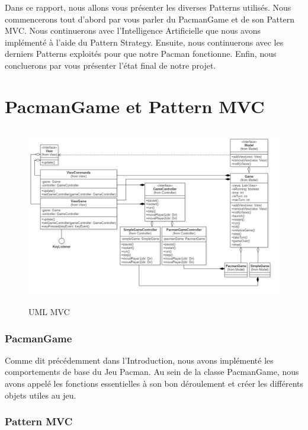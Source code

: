 \documentclass[a4paper, 11pt]{article}
\begin{document}
Dans ce rapport, nous allons vous présenter les diverses Patterns utilisés. Nous commencerons tout d'abord par vous parler du PacmanGame et de son Pattern MVC. Nous continuerons
avec l'Intelligence Artificielle que nous avons implémenté à l'aide du Pattern Strategy. Ensuite, nous continuerons avec les derniers Patterns exploités pour que notre 
Pacman fonctionne. Enfin, nous concluerons par vous présenter l'état final de notre projet.


\part{PacmanGame et Pattern MVC}

\begin{figure}[!ht]
  \begin{center}
  \includegraphics[height=7.8cm]{img/png/mvc}
  \end{center}
  \caption[schema]{UML MVC}
\end{figure}

\section*{PacmanGame}
  
Comme dit précédemment dans l'Introduction, nous avons implémenté les comportements de base du Jeu Pacman. Au sein de la classe PacmanGame, nous avons appelé
les fonctions essentielles à son bon déroulement et créer les différents objets utiles au jeu. \\
 
\section*{Pattern MVC}
  
\end{document}
